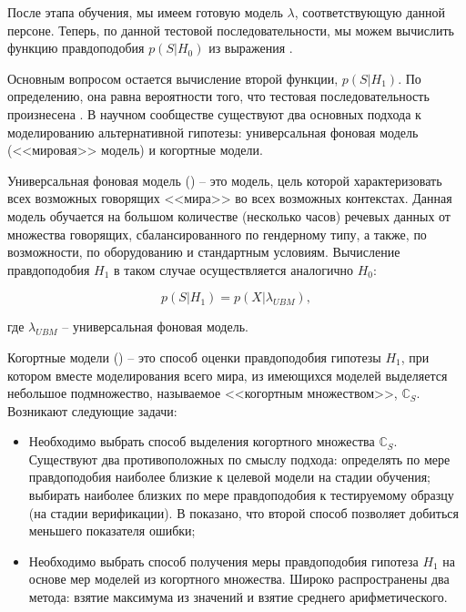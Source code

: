 После этапа обучения, мы имеем готовую модель $\lambda$, соответствующую данной персоне. Теперь, по данной тестовой последовательности, мы можем вычислить функцию правдоподобия $p(S|H_0)$ из выражения .

Основным вопросом остается вычисление второй функции, $p(S|H_1)$. По определению, она равна вероятности того, что тестовая последовательность произнесена . В научном сообществе существуют два основных подхода к моделированию альтернативной гипотезы: универсальная фоновая модель (<<мировая>> модель) и когортные модели.

Универсальная фоновая модель () -- это модель, цель которой характеризовать всех возможных говорящих <<мира>> во всех возможных контекстах. Данная модель обучается на большом количестве (несколько часов) речевых данных от множества говорящих, сбалансированного по гендерному типу, а также, по возможности, по оборудованию и стандартным условиям. Вычисление правдоподобия $H_1$ в таком случае осуществляется аналогично $H_0$:

\begin{equation}
\label{eq:likelihood_ubm}
p(S|H_1) = p(X|\lambda_{UBM}),
\end{equation}

\noindent где $\lambda_{UBM}$ -- универсальная фоновая модель.

Когортные модели () -- это способ оценки правдоподобия гипотезы $H_1$, при котором вместе моделирования всего мира, из имеющихся моделей выделяется небольшое подмножество, называемое <<когортным множеством>>, $\mathbb{C}_S$. Возникают следующие задачи:
\begin{itemize}
\item Необходимо выбрать способ выделения когортного множества $\mathbb{C}_S$. Существуют два противоположных по смыслу подхода: определять по мере правдоподобия наиболее близкие к целевой модели на стадии обучения; выбирать наиболее близких по мере правдоподобия к тестируемому образцу (на стадии верификации). В \cite{Kinnunen04cohort} показано, что второй способ позволяет добиться меньшего показателя ошибки;
\item Необходимо выбрать способ получения меры правдоподобия гипотеза $H_1$ на основе мер моделей из когортного множества. Широко распространены два метода: взятие максимума из значений и взятие среднего арифметического.
\end{itemize}


